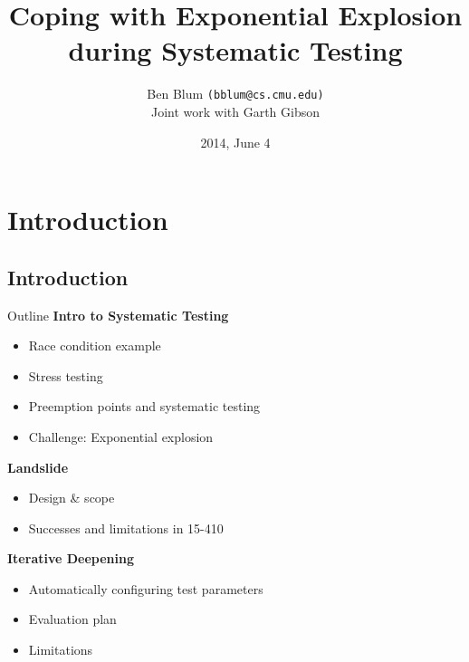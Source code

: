 \documentclass[xcolor=dvipsnames]{beamer}
\title[Landslide]{{\bf Coping with Exponential Explosion \\ during Systematic Testing}}
\author[Ben Blum]{Ben Blum \texttt{(bblum@cs.cmu.edu)} \\ {\small Joint work with Garth Gibson}}
\institute[CMU]{Carnegie Mellon University}
\date[]{2014, June 4}
\begin{document}
\normalem
\begin{frame}
	\titlepage
\end{frame}


\newcommand\linegap{\vspace{0.2in}}
\newcommand\breakslide[1]{\begin{frame}{} \begin{center} {\Large #1} \end{center} \end{frame}}

\section{Introduction}


\subsection{Introduction}

\begin{frame}{Outline}
	\textbf{Intro to Systematic Testing}
	\begin{itemize}
		\item Race condition example
		\item Stress testing
		\item Preemption points and systematic testing
		\item Challenge: Exponential explosion
	\end{itemize}
	{\bf Landslide}
	\begin{itemize}
		\item Design \& scope
		\item Successes and limitations in 15-410
	\end{itemize}
	{\bf Iterative Deepening}
	\begin{itemize}
		\item Automatically configuring test parameters
		\item Evaluation plan
		\item Limitations

	\end{itemize}
\end{frame}
\end{document}
